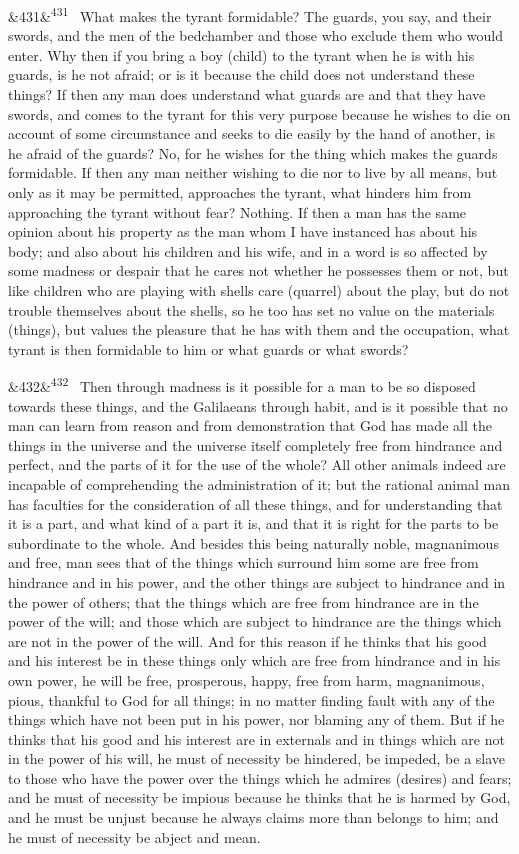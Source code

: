 \documentclass[12pt]{article}
\newcommand{\para}[1][]{\par\noindent\ifx&#1&\else\textsuperscript{\footnotesize #1}~\fi}
\begin{document}
\para[431] What makes the tyrant formidable? The guards, you say, and their swords, and the men of the bedchamber and those who exclude them who would enter. Why then if you bring a boy (child) to the tyrant when he is with his guards, is he not afraid; or is it because the child does not understand these things? If then any man does understand what guards are and that they have swords, and comes to the tyrant for this very purpose because he wishes to die on account of some circumstance and seeks to die easily by the hand of another, is he afraid of the guards? No, for he wishes for the thing which makes the guards formidable. If then any man neither wishing to die nor to live by all means, but only as it may be permitted, approaches the tyrant, what hinders him from approaching the tyrant without fear? Nothing. If then a man has the same opinion about his property as the man whom I have instanced has about his body; and also about his children and his wife, and in a word is so affected by some madness or despair that he cares not whether he possesses them or not, but like children who are playing with shells care (quarrel) about the play, but do not trouble themselves about the shells, so he too has set no value on the materials (things), but values the pleasure that he has with them and the occupation, what tyrant is then formidable to him or what guards or what swords?

\para[432] Then through madness is it possible for a man to be so disposed towards these things, and the Galilaeans through habit, and is it possible that no man can learn from reason and from demonstration that God has made all the things in the universe and the universe itself completely free from hindrance and perfect, and the parts of it for the use of the whole? All other animals indeed are incapable of comprehending the administration of it; but the rational animal man has faculties for the consideration of all these things, and for understanding that it is a part, and what kind of a part it is, and that it is right for the parts to be subordinate to the whole. And besides this being naturally noble, magnanimous and free, man sees that of the things which surround him some are free from hindrance and in his power, and the other things are subject to hindrance and in the power of others; that the things which are free from hindrance are in the power of the will; and those which are subject to hindrance are the things which are not in the power of the will. And for this reason if he thinks that his good and his interest be in these things only which are free from hindrance and in his own power, he will be free, prosperous, happy, free from harm, magnanimous, pious, thankful to God for all things; in no matter finding fault with any of the things which have not been put in his power, nor blaming any of them. But if he thinks that his good and his interest are in externals and in things which are not in the power of his will, he must of necessity be hindered, be impeded, be a slave to those who have the power over the things which he admires (desires) and fears; and he must of necessity be impious because he thinks that he is harmed by God, and he must be unjust because he always claims more than belongs to him; and he must of necessity be abject and mean.
\end{document}

